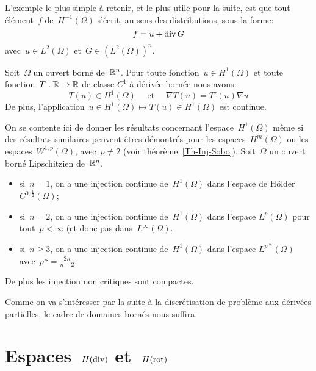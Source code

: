 \bigskip
L'exemple le plus simple à retenir, et le plus utile pour la suite, est que tout élément~$f$ de~$H^{-1}(\Omega)$ s'écrit, au sens des distributions, sous la forme:
\begin{equation}\colorred
f = u + \dive G
\end{equation}
avec~$u \in L^2(\Omega)$ et~$G \in (L^2(\Omega))^n$.
\medskip
\begin{theoreme}
Soit~$\Omega$ un ouvert borné de~$\mathbb R^n$.
Pour toute fonction~$u \in H^1(\Omega)$ et toute fonction~$T: \mathbb R \to \mathbb R$ de classe $C^1$ à dérivée bornée nous avons:
\begin{equation}
T(u) \in H^1(\Omega)\quad\text{ et }\quad\nabla T(u) = T'(u)\nabla u
\end{equation}
De plus, l'application~$u \in H^1(\Omega) \mapsto T(u) \in H^1(\Omega)$ est continue.
\end{theoreme}
\medskip
On se contente ici de donner les résultats concernant l'espace~$H^1(\Omega)$ même si des résultats similaires peuvent êtres démontrés pour les espaces~$H^m(\Omega)$ ou les espaces~$W^{1,p}(\Omega)$, avec~$p\ne 2$ (voir théorème~\ref{Th-Inj-Sobo}).
Soit~$\Omega$ un ouvert borné Lipschitzien de~$\mathbb R^n$.
\begin{itemize}
  \item si~$n=1$, on a une injection continue de~$H^1(\Omega)$ dans l'espace de Hölder~$C^{0,\frac12}(\Omega)$;
  \item si~$n=2$, on a une injection continue de~$H^1(\Omega)$ dans l'espace $L^p(\Omega)$ pour tout~$p<\infty$ (et donc pas dans~$L^\infty(\Omega)$.
  \item si~$n\ge 3$, on a une injection continue de~$H^1(\Omega)$ dans l'espace $L^{p*}(\Omega)$ avec~$p*=\frac{2n}{n-2}$.
\end{itemize}
De plus les injection non critiques sont compactes.

Comme on va s'intéresser par la suite à la discrétisation de problème aux dérivées partielles, le cadre de domaines bornés nous suffira.

\medskip\ifVersionDuDocEstVincent\else\newpage\fi
\section{Espaces~$H(\operatorname{div})$ et~$H(\operatorname{rot})$}


